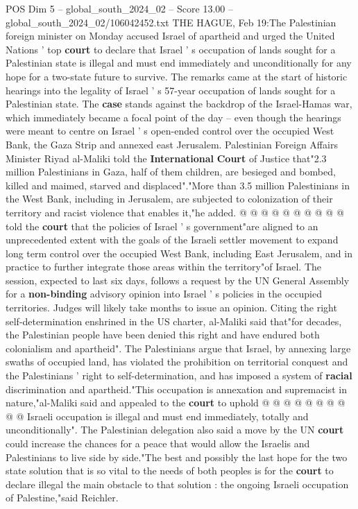 \begin{textsample}{POS Dim 5 – global\_south\_2024\_02 – Score 13.00 – global\_south\_2024\_02/106042452.txt}  \label{ex:f5_pos_200}
THE HAGUE, Feb 19:The Palestinian foreign minister on Monday accused Israel of apartheid and urged the United Nations ' top \textbf{court} to declare that Israel ' s occupation of lands sought for a Palestinian state is illegal and must end immediately and unconditionally for any hope for a two-state future to survive.
The remarks came at the start of historic hearings into the legality of Israel ' s 57-year occupation of lands sought for a Palestinian state.
The \textbf{case} stands against the backdrop of the Israel-Hamas war, which immediately became a focal point of the day -- even though the hearings were meant to centre on Israel ' s open-ended control over the occupied West Bank, the Gaza Strip and annexed east Jerusalem.
Palestinian Foreign Affairs Minister Riyad al-Maliki told the \textbf{International} \textbf{Court} of Justice that"2.3 million Palestinians in Gaza, half of them children, are besieged and bombed, killed and maimed, starved and displaced"."More than 3.5 million Palestinians in the West Bank, including in Jerusalem, are subjected to colonization of their territory and racist violence that enables it,"he added. @ @ @ @ @ @ @ @ @ @ told the \textbf{court} that the policies of Israel ' s government"are aligned to an unprecedented extent with the goals of the Israeli settler movement to expand long term control over the occupied West Bank, including East Jerusalem, and in practice to further integrate those areas within the territory"of Israel.
The session, expected to last six days, follows a request by the UN General Assembly for a \textbf{non-binding} advisory opinion into Israel ' s policies in the occupied territories.
Judges will likely take months to issue an opinion.
Citing the right self-determination enshrined in the US charter, al-Maliki said that"for decades, the Palestinian people have been denied this right and have endured both colonialism and apartheid".
The Palestinians argue that Israel, by annexing large swaths of occupied land, has violated the prohibition on territorial conquest and the Palestinians ' right to self-determination, and has imposed a system of \textbf{racial} discrimination and apartheid."This occupation is annexation and supremacist in nature,"al-Maliki said and appealed to the \textbf{court} to uphold @ @ @ @ @ @ @ @ @ @ Israeli occupation is illegal and must end immediately, totally and unconditionally".
The Palestinian delegation also said a move by the UN \textbf{court} could increase the chances for a peace that would allow the Israelis and Palestinians to live side by side."The best and possibly the last hope for the two state solution that is so vital to the needs of both peoples is for the \textbf{court} to declare illegal the main obstacle to that solution : the ongoing Israeli occupation of Palestine,"said Reichler.

\end{textsample}
